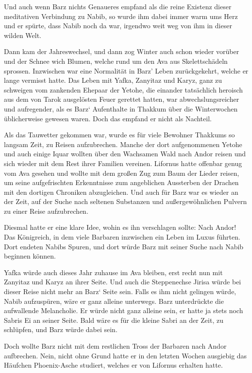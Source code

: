 Und auch wenn Barz nichts Genaueres empfand als die reine Existenz dieser meditativen Verbindung zu Nabib, so wurde ihm dabei immer warm ums Herz und er spürte, dass Nabib noch da war, irgendwo weit weg von ihm in dieser wilden Welt.


Dann kam der Jahreswechsel, und dann zog Winter auch schon wieder vorüber und der Schnee wich Blumen, welche rund um den Ava aus Skelettschädeln sprossen. Inzwischen war eine Normalität in Barz’ Leben zurückgekehrt, welche er lange vermisst hatte. Das Leben mit Yafka, Zanyitaz und Karyz, ganz zu schweigen vom zankenden Ehepaar der Yetohe, die einander tatsächlich heroisch aus dem von Tarok ausgelösten Feuer gerettet hatten, war abwechslungsreicher und aufregender, als es Barz‘ Aufenthalte in Thakkum über die Winterwochen üblicherweise gewesen waren. Doch das empfand er nicht als Nachteil.

Als das Tauwetter gekommen war, wurde es für viele Bewohner Thakkums so langsam Zeit, zu Reisen aufzubrechen. Manche der dort aufgenommenen Yetohe und auch einige Iquar wollten über den Wachsamen Wald nach Andor reisen und sich wieder mit dem Rest ihrer Familien vereinen. Lifornus hatte offenbar genug vom Ava gesehen und wollte mit dem großen Zug zum Baum der Lieder reisen, um seine aufgefrischten Erkenntnisse zum angeblichen Aussterben der Drachen mit den dortigen Chroniken abzugleichen. Und auch für Barz war es wieder an der Zeit, auf der Suche nach seltenen Substanzen und außergewöhnlichen Pulvern zu einer Reise aufzubrechen.

Diesmal hatte er eine klare Idee, wohin es ihn verschlagen sollte: Nach Andor! Das Königreich, in dem viele Barbaren inzwischen ein Leben im Luxus führten. Dort endeten Nabibs Spuren, und dort würde Barz mit seiner Suche nach Nabib beginnen können.

Yafka würde auch dieses Jahr zuhause im Ava bleiben, erst recht nun mit Zanyitaz und Karyz an ihrer Seite. Und auch die Steppenechse Jirisa würde bei dieser Reise nicht mehr an Barz‘ Seite sein. Falls es ihm nicht gelingen würde, Nabib aufzuspüren, wäre er ganz alleine unterwegs. Barz unterdrückte die aufwallende Melancholie. Er würde nicht ganz alleine sein, er hatte ja stets noch Sabris Ei an seiner Seite. Bald wäre es für die kleine Sabri an der Zeit, zu schlüpfen, und Barz würde dabei sein.

Doch wollte Barz nicht mit dem restlichen Tross der Barbaren nach Andor aufbrechen. Nein, nicht ohne Grund hatte er in den letzten Wochen ausgiebig das Häufchen Phoenix-Asche studiert, welches er von Lifornus erhalten hatte.

